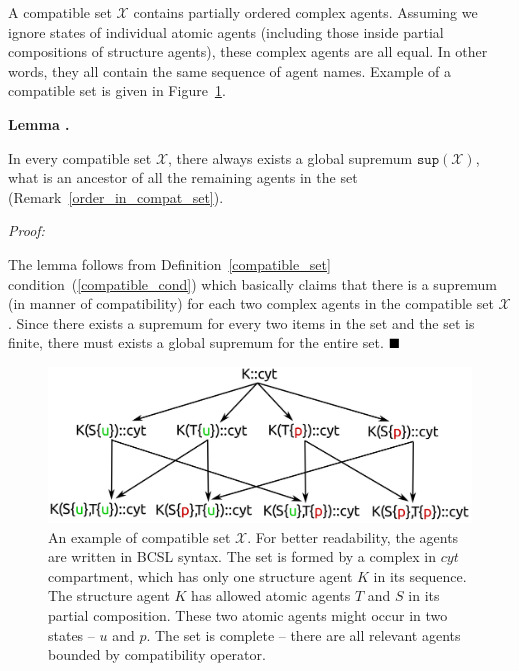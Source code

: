 \documentclass[12pt, twoside]{fithesis2} %
\newcounter{counter}[section]
\renewcommand{\thecounter}{\thesection.\arabic{counter}}
\newenvironment{proof}{\noindent\emph{Proof:~ }\nopagebreak \begin{itshape}}{\end{itshape}\bigskip}
\newenvironment{lemma}{\bigskip\refstepcounter{counter}\noindent\textbf{Lemma \thecounter }\nopagebreak \begin{itshape}}{\end{itshape}\bigskip}
\newcommand*{\QEDA}{\hfill\ensuremath{\blacksquare}}%
\begin{document}
A compatible set $\mathscr{X}$ contains partially ordered complex agents. Assuming we ignore states of individual atomic agents (including those inside partial compositions of structure agents), these complex agents are all equal. In other words, they all contain the same sequence of agent names. Example of a compatible set is given in Figure~\ref{compatible_set_example}.

\begin{lemma}
\label{global_supremum}
In every compatible set $\mathscr{X}$, there always exists a global supremum $\mathtt{sup}(\mathscr{X})$, what is an ancestor of all the remaining agents in the set (Remark~\ref{order_in_compat_set}).
\end{lemma}

\begin{proof}
The lemma follows from Definition~\ref{compatible_set} condition~(\ref{compatible_cond}) which basically claims that there is a supremum (in manner of compatibility) for each two complex agents in the compatible set $\mathscr{X}$. Since there exists a supremum for every two items in the set and the set is finite, there must exists a global supremum for the entire set. $\QEDA$
\end{proof}

\begin{figure}[!h]
\begin{center}
\includegraphics[scale=0.13]{pics/partial_order}
\end{center}
\caption{An example of compatible set $\mathscr{X}$. For better readability, the agents are written in BCSL syntax. The set is formed by a complex in $cyt$ compartment, which has only one structure agent $K$ in its sequence. The structure agent $K$ has allowed atomic agents $T$ and $S$ in its partial composition. These two atomic agents might occur in two states -- $u$ and $p$. The set is complete -- there are all relevant agents bounded by compatibility operator.}\label{compatible_set_example}
\end{figure}
\end{document}
